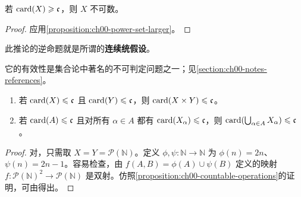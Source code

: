\documentclass[../../main.tex]{subfiles}%
\begin{document}
\begin{corollary}\label{corollary:ch00-continuum-uncountable}
若 $\operatorname{card}(X)\geqslant\mathfrak{c}$，则 $X$ 不可数。
\end{corollary}
\begin{proof}
应用\cref{proposition:ch00-power-set-larger}。
\end{proof}

\begin{definition}[连续统假设]\label{definition:ch00-continuum-hypothesis}
此推论的逆命题就是所谓的\textbf{连续统假设}。
\end{definition}
\begin{remark}
它的有效性是集合论中著名的不可判定问题之一；见\cref{section:ch00-notes-references}。
\end{remark}

\begin{proposition}\label{proposition:ch00-continuum-operations}
\begin{enumerate}[label=\alph*.,ref=(\alph*)]
\item\label{item:ch00-continuum-product} 若 $\operatorname{card}(X)\leqslant\mathfrak{c}$ 且 $\operatorname{card}(Y)\leqslant\mathfrak{c}$，则 $\operatorname{card}(X\times Y)\leqslant\mathfrak{c}$。
\item\label{item:ch00-continuum-union} 若 $\operatorname{card}(A)\leqslant\mathfrak{c}$ 且对所有 $\alpha\in A$ 都有 $\operatorname{card}(X_\alpha)\leqslant\mathfrak{c}$，则 $\operatorname{card}(\bigcup_{\alpha\in A}X_\alpha)\leqslant\mathfrak{c}$。
\end{enumerate}
\end{proposition}
\begin{proof}
对，只需取 $X=Y=\mathscr{P}(\mathbb{N})$。定义 $\phi,\psi:\mathbb{N}\to\mathbb{N}$ 为 $\phi(n)=2n$、$\psi(n)=2n-1$。容易检查，由 $f(A,B)=\phi(A)\cup\psi(B)$ 定义的映射 $f:\mathscr{P}(\mathbb{N})^2\to\mathscr{P}(\mathbb{N})$ 是双射。仿照\cref{proposition:ch00-countable-operations}的证明，可由得出。
\end{proof}
\end{document}
